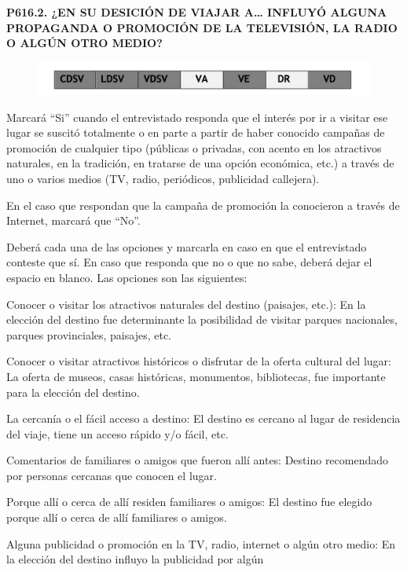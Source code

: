 \documentclass[
  openany]{book}
\begin{document}
\textbf{P616.2. ¿EN SU DESICIÓN DE VIAJAR A\ldots{} INFLUYÓ ALGUNA PROPAGANDA O PROMOCIÓN DE LA TELEVISIÓN, LA RADIO O ALGÚN OTRO MEDIO?}

\begin{figure}

{\centering \includegraphics[width=1\linewidth]{imagenes/figura6-110} 

}

\end{figure}

Marcará ``Si'' cuando el entrevistado responda que el interés por ir a visitar ese lugar se suscitó totalmente o en parte a partir de haber conocido campañas de promoción de cualquier tipo (públicas o privadas, con acento en los atractivos naturales, en la tradición, en tratarse de una opción económica, etc.) a través de uno o varios medios (TV, radio, periódicos, publicidad callejera).

En el caso que respondan que la campaña de promoción la conocieron a través de Internet, marcará que ``No''.

Deberá cada una de las opciones y marcarla en caso en que el entrevistado conteste que sí. En caso que responda que no o que no sabe, deberá dejar el espacio en blanco. Las opciones son las siguientes:

Conocer o visitar los atractivos naturales del destino (paisajes, etc.): En la elección del destino fue determinante la posibilidad de visitar parques nacionales, parques provinciales, paisajes, etc.

Conocer o visitar atractivos históricos o disfrutar de la oferta cultural del lugar: La oferta de museos, casas históricas, monumentos, bibliotecas, fue importante para la elección del destino.

La cercanía o el fácil acceso a destino: El destino es cercano al lugar de residencia del viaje, tiene un acceso rápido y/o fácil, etc.

Comentarios de familiares o amigos que fueron allí antes: Destino recomendado por personas cercanas que conocen el lugar.

Porque allí o cerca de allí residen familiares o amigos: El destino fue elegido porque allí o cerca de allí familiares o amigos.

Alguna publicidad o promoción en la TV, radio, internet o algún otro medio: En la elección del destino influyo la publicidad por algún
\end{document}
